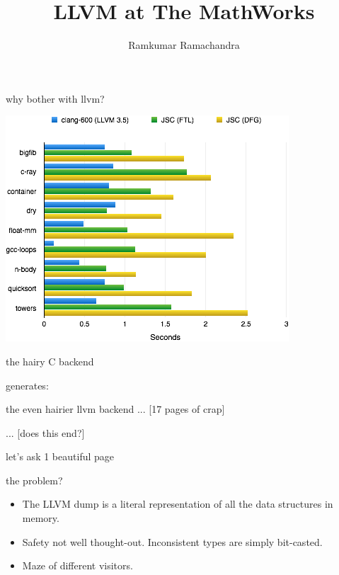 \documentclass{beamer}
\title{LLVM at The MathWorks}
\author{Ramkumar Ramachandra}
\institute{The MathWorks}
\begin{document}
\begin{frame}
  \titlepage
\end{frame}

\begin{frame}{why bother with llvm?}
  \begin{center}\includegraphics[scale=0.55]{asmjs-ftl-shootout}\end{center}
\end{frame}

\begin{frame}{the hairy C backend}
  
  generates:
  
\end{frame}

\begin{frame}{the even hairier llvm backend}
  ... [17 pages of crap]
  
  ... [does this end?]
\end{frame}

\begin{frame}{let's ask }
  1 beautiful page
  
\end{frame}

\begin{frame}{the problem?}
  \begin{itemize}
  \item The LLVM dump is a literal representation of all the data structures in
    memory.
  \item Safety not well thought-out. Inconsistent types are simply bit-casted.
  \item Maze of different visitors.
  \end{itemize}
\end{frame}
\end{document}
